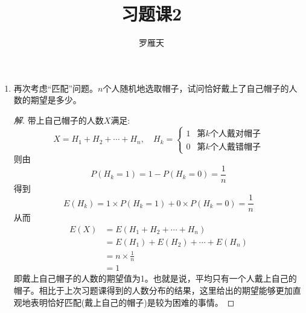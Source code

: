 \documentclass[12pt]{article}
\newcommand{\hei}{\CJKfamily{hei}}                          %
\begin{document}
\author{罗雁天}
\title{习题课2}
\maketitle

\medskip

\begin{enumerate}

\item {\hei 再次考虑“匹配”问题。$n$个人随机地选取帽子，试问恰好戴上了自己帽子的人数的期望是多少。}

\begin{proof}[解]
	带上自己帽子的人数$X$满足:
	\begin{equation}
	X=H_1+H_2+\cdots+H_n,\quad H_k=\left\{
	\begin{array}{cc}
	1 & \mbox{第$k$个人戴对帽子}\\
	0 & \mbox{第$k$个人戴错帽子}
	\end{array}
	\right.
	\end{equation}
	则由\begin{equation}
	P(H_k=1)=1-P(H_k=0)=\frac{1}{n}
	\end{equation}
	得到\begin{equation}
	E(H_k)=1\times P(H_k=1)+0\times P(H_k=0)=\frac{1}{n}
	\end{equation}
	从而\begin{equation}
	\begin{aligned}
	E(X)&=E(H_1+H_2+\cdots+H_n)\\
	&=E(H_1)+E(H_2)+\cdots+E(H_n) \\
	&=n\times \frac{1}{n} \\
	&=1
	\end{aligned}
	\end{equation}
	即戴上自己帽子的人数的期望值为1。也就是说，平均只有一个人戴上自己的帽子。相比于上次习题课得到的人数分布的结果，这里给出的期望能够更加直观地表明恰好匹配(戴上自己的帽子)是较为困难的事情。
\end{proof}


\end{enumerate}
\end{document}
